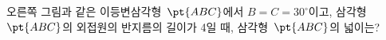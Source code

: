 \noindent\begin{minipage}[t]{0.58\linewidth}\vspace{0pt}\raggedright 오른쪽 그림과 같은 이등변삼각형~$\pt{ABC}$에서 $B=C=30^\circ$이고, 삼각형~$\pt{ABC}$의 외접원의 반지름의 길이가 4일 때, 삼각형~$\pt{ABC}$의 넓이는?\end{minipage}\hfill\begin{minipage}[t]{0.4\linewidth}\vspace{0pt}\centering \resizebox{\ifdim\width>\linewidth\linewidth\else\width\fi}{!}{}\end{minipage}\par
{}
